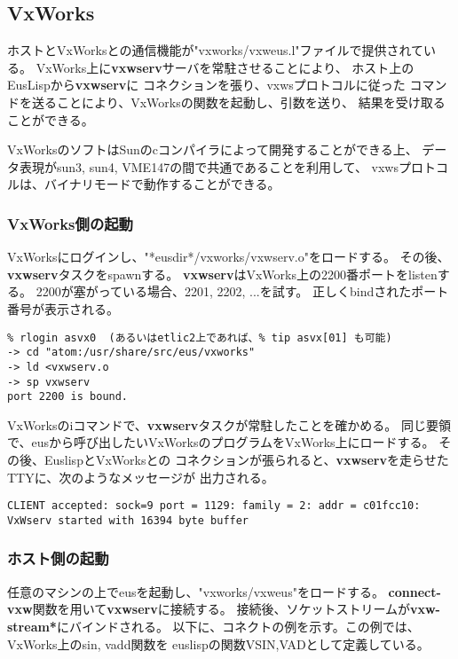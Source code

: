 \subsection{VxWorks}
ホストとVxWorksとの通信機能が"vxworks/vxweus.l"ファイルで提供されている。
VxWorks上に{\bf vxwserv}サーバを常駐させることにより、
ホスト上のEusLispから{\bf vxwserv}に
コネクションを張り、vxwsプロトコルに従った
コマンドを送ることにより、VxWorksの関数を起動し、引数を送り、
結果を受け取ることができる。

VxWorksのソフトはSunのcコンパイラによって開発することができる上、
データ表現がsun3, sun4, VME147の間で共通であることを利用して、
vxwsプロトコルは、バイナリモードで動作することができる。

\subsubsection{VxWorks側の起動}
VxWorksにログインし、"*eusdir*/vxworks/vxwserv.o"をロードする。
その後、{\bf vxwserv}タスクをspawnする。
{\bf vxwserv}はVxWorks上の2200番ポートをlistenする。
2200が塞がっている場合、2201, 2202, ...を試す。
正しくbindされたポート番号が表示される。

\begin {verbatim}
-> cd "atom:/usr/share/src/eus/vxworks"
-> ld <vxwserv.o
-> sp vxwserv
port 2200 is bound.
\end{verbatim}

VxWorksのiコマンドで、{\bf vxwserv}タスクが常駐したことを確かめる。
同じ要領で、eusから呼び出したいVxWorksのプログラムをVxWorks上にロードする。
その後、EuslispとVxWorksとの
コネクションが張られると、{\bf vxwserv}を走らせたTTYに、次のようなメッセージが
出力される。

\begin{verbatim}
CLIENT accepted: sock=9 port = 1129: family = 2: addr = c01fcc10:
VxWserv started with 16394 byte buffer
\end{verbatim}

\subsubsection{ホスト側の起動}
任意のマシンの上でeusを起動し、"vxworks/vxweus"をロードする。
{\bf connect-vxw}関数を用いて{\bf vxwserv}に接続する。
接続後、ソケットストリームが{\bf *vxw-stream*}にバインドされる。
以下に、コネクトの例を示す。この例では、VxWorks上のsin, vadd関数を
euslispの関数VSIN,VADとして定義している。


